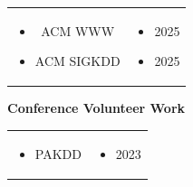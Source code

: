 \documentclass[9pt,a4paper]{article}
\begin{document}
\begin{tabular}{cc}
  \begin{minipage}[h]{0.17\textwidth}
    {\setlength{\leftmargini}{17.2pt}
    \begin{itemize}
      \vspace{0.9em}
      \item ACM WWW
      \item ACM SIGKDD
    \end{itemize}}
  \end{minipage} &
  \begin{minipage}[h]{0.83\textwidth}
    {\setlength{\leftmargini}{-5pt}
    \begin{itemize}
      \vspace{0.9em}
      \item[] 2025
      \item[] 2025
    \end{itemize}}
  \end{minipage}
\end{tabular}

\vspace{1.0em}
{\fontsize{11pt}{0}\textbf{Conference Volunteer Work}}

\begin{tabular}{cc}
  \begin{minipage}[h]{0.17\textwidth}
    {\setlength{\leftmargini}{17.2pt}
    \begin{itemize}
      \vspace{0.5em}
      \item PAKDD
    \end{itemize}}
  \end{minipage} &
  \begin{minipage}[h]{0.83\textwidth}
    {\setlength{\leftmargini}{-5pt}
    \begin{itemize}
      \vspace{0.5em}
      \item[] 2023
    \end{itemize}}
  \end{minipage}
\end{tabular}
\end{document}
